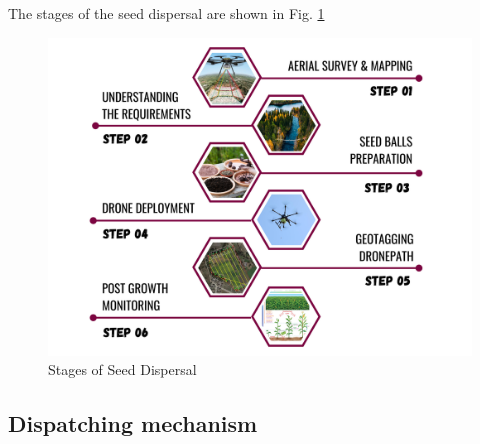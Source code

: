 \documentclass[conference]{IEEEtran}
\begin{document}
The stages of the seed dispersal are shown in Fig. \ref{sd}
\begin{figure}[htp]
    \centering
    \includegraphics[scale =0.05]{Narcondam_flowchart.png}
    \caption{Stages of Seed Dispersal}
    \label{sd}
\end{figure}


\subsection{Dispatching mechanism}
\end{document}
